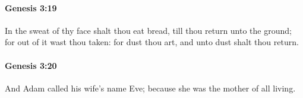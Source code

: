 		\paragraph{Genesis 3:19} %
			\label{GENESIS-3-19}

			In the sweat of thy face shalt thou eat bread, till thou return unto the ground; for out of it wast thou taken: for dust thou art, and unto dust shalt thou return.


		\paragraph{Genesis 3:20} %
			\label{GENESIS-3-20}

			And Adam called his wife's name Eve; because she was the mother of all living.


